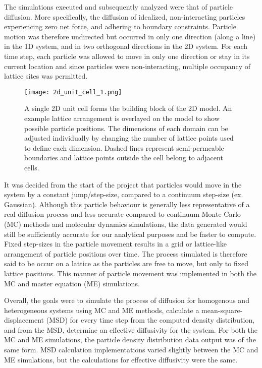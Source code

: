 	The simulations executed and subsequently analyzed were that of particle diffusion. More specifically, the diffusion of idealized, non-interacting particles experiencing zero net force, and adhering to boundary constraints. Particle motion was therefore undirected but occurred in only one direction (along a line) in the 1D system, and in two orthogonal directions in the 2D system. For each time step, each particle was allowed to move in only one direction or stay in its current location and since particles were non-interacting, multiple occupancy of lattice sites was permitted.
	
	\begin{figure}[h]
		\centering
		\texttt{[image: 2d\_unit\_cell\_1.png]}
		\caption{A single 2D unit cell forms the building block of the 2D model. An example lattice arrangement is overlayed on the model to show possible particle positions. The dimensions of each domain can be adjusted individually by changing the number of lattice points used to define each dimension. Dashed lines represent semi-permeable boundaries and lattice points outside the cell belong to adjacent cells.}
		\label{fig:2d_unit_cell_1.png}
	\end{figure}

	It was decided from the start of the project that particles would move in the system by a constant jump/step-size, compared to a continuum step-size (ex. Gaussian). Although this particle behaviour is generally less representative of a real diffusion process and less accurate compared to continuum Monte Carlo (MC) methods and molecular dynamics simulations, the data generated would still be sufficiently accurate for our analytical purposes and be faster to compute. Fixed step-sizes in the particle movement results in a grid or lattice-like arrangement of particle positions over time. The process simulated is therefore said to be occur on a lattice as the particles are free to move, but only to fixed lattice positions. This manner of particle movement was implemented in both the MC and master equation (ME) simulations.

	Overall, the goals were to simulate the process of diffusion for homogenous and heterogeneous systems using MC and ME methods, calculate a mean-square-displacement (MSD) for every time step from the computed density distribution, and from the MSD, determine an effective diffusivity for the system. For both the MC and ME simulations, the particle density distribution data output was of the same form. MSD calculation implementations varied slightly between the MC and ME simulations, but the calculations for effective diffusivity were the same. 	

